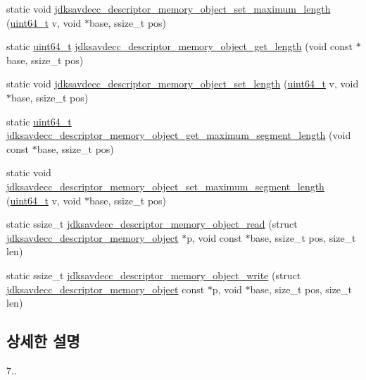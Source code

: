 \begin{DoxyCompactItemize}
\item 
static void \hyperlink{group__descriptor__memory__object_ga523584c439c14c9121f4a0411d64b2d5}{jdksavdecc\+\_\+descriptor\+\_\+memory\+\_\+object\+\_\+set\+\_\+maximum\+\_\+length} (\hyperlink{parse_8c_aec6fcb673ff035718c238c8c9d544c47}{uint64\+\_\+t} v, void $\ast$base, ssize\+\_\+t pos)
\item 
static \hyperlink{parse_8c_aec6fcb673ff035718c238c8c9d544c47}{uint64\+\_\+t} \hyperlink{group__descriptor__memory__object_gab5f8a35ab8a52ab9f7fac1a64159d07e}{jdksavdecc\+\_\+descriptor\+\_\+memory\+\_\+object\+\_\+get\+\_\+length} (void const $\ast$base, ssize\+\_\+t pos)
\item 
static void \hyperlink{group__descriptor__memory__object_gad149e5768497a72cf665918d1cc1ce38}{jdksavdecc\+\_\+descriptor\+\_\+memory\+\_\+object\+\_\+set\+\_\+length} (\hyperlink{parse_8c_aec6fcb673ff035718c238c8c9d544c47}{uint64\+\_\+t} v, void $\ast$base, ssize\+\_\+t pos)
\item 
static \hyperlink{parse_8c_aec6fcb673ff035718c238c8c9d544c47}{uint64\+\_\+t} \hyperlink{group__descriptor__memory__object_ga1943dfa8f47638d4986e654391c0e2f4}{jdksavdecc\+\_\+descriptor\+\_\+memory\+\_\+object\+\_\+get\+\_\+maximum\+\_\+segment\+\_\+length} (void const $\ast$base, ssize\+\_\+t pos)
\item 
static void \hyperlink{group__descriptor__memory__object_gae409b24b5b3631caa834820c4558dd34}{jdksavdecc\+\_\+descriptor\+\_\+memory\+\_\+object\+\_\+set\+\_\+maximum\+\_\+segment\+\_\+length} (\hyperlink{parse_8c_aec6fcb673ff035718c238c8c9d544c47}{uint64\+\_\+t} v, void $\ast$base, ssize\+\_\+t pos)
\item 
static ssize\+\_\+t \hyperlink{group__descriptor__memory__object_ga0eaaafc720b2652958e03a4791d990a0}{jdksavdecc\+\_\+descriptor\+\_\+memory\+\_\+object\+\_\+read} (struct \hyperlink{structjdksavdecc__descriptor__memory__object}{jdksavdecc\+\_\+descriptor\+\_\+memory\+\_\+object} $\ast$p, void const $\ast$base, ssize\+\_\+t pos, size\+\_\+t len)
\item 
static ssize\+\_\+t \hyperlink{group__descriptor__memory__object_ga3bfd287144ec5c1b52fce402f2c8aa9e}{jdksavdecc\+\_\+descriptor\+\_\+memory\+\_\+object\+\_\+write} (struct \hyperlink{structjdksavdecc__descriptor__memory__object}{jdksavdecc\+\_\+descriptor\+\_\+memory\+\_\+object} const $\ast$p, void $\ast$base, size\+\_\+t pos, size\+\_\+t len)
\end{DoxyCompactItemize}


\subsection{상세한 설명}
7.. 

